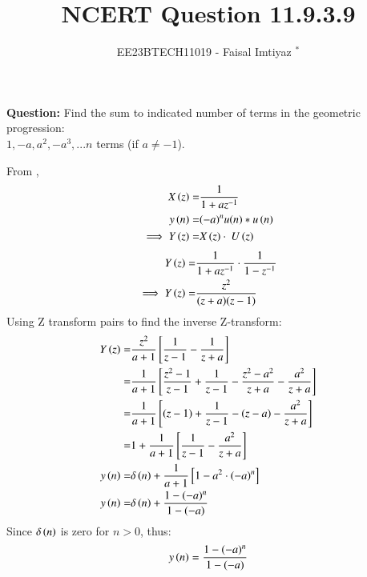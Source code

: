 \documentclass[journal,12pt,twocolumn]{IEEEtran}
\theoremstyle{remark}
\begin{document}

\vspace{3cm}
\title{NCERT Question 11.9.3.9}
\author{EE23BTECH11019 - Faisal Imtiyaz $^{*}$%
}
\maketitle
\newpage
\bigskip

\renewcommand{\thefigure}{\arabic{figure}}
\renewcommand{\thetable}{\arabic{table}}


\vspace{3cm}
\textbf{Question:} Find the sum to indicated number of terms in the geometric progression:\\
$1,-a, a^2, -a^3,...n$ terms (if $a\neq-1$).\\
\solution

\newline
From ,
\begin{align}
X\left(z\right) =& \frac{1}{1+az^{-1}}\\
y\left(n\right)= &{(-a)^n}u(n)*u\left(n\right)\\
\implies Y\left(z\right)= &X\left(z\right)\cdot\ U\left(z\right)
\end{align}
\begin{align}
    Y\left(z\right) = &\frac{1}{1+az^{-1}}\cdot\frac{1}{1-z^{-1}}\\
    \implies Y\left(z\right) = &\frac{z^{2}}{(z+a)(z-1)}
\end{align}
Using Z transform pairs  to find the inverse Z-transform:\\
\begin{align}
    Y\left(z\right)=& \frac{z^{2}}{a+1}{}\left[\frac{1}{z-1} - \frac{1}{z+a}\right]\\
    =& \frac{1}{a+1}{}\left[\frac{z^{2}-1}{z-1}+\frac{1}{z-1} -\frac{z^{2}-a^{2}}{z+a} -\frac{a^{2}}{z+a}\right] \\
    =& \frac{1}{a+1}{}\left[(z-1)+\frac{1}{z-1}-(z-a)-\frac{a^{2}}{z+a}\right]\\
    =& 1+\frac{1}{a+1}{}\left[\frac{1}{z-1}-\frac{a^{2}}{z+a}\right]\\
    y\left(n\right) =& \delta\left(n\right) + \frac{1}{a+1}{}\left[1- a^{2}\cdot(-a)^{n}\right]\\
    y\left(n\right) =& \delta\left(n\right)+ \frac{1-(-a)^{n}}{1-(-a)}\\
\end{align}
Since $\delta\left(n\right)$ is zero for $n>0$, thus:
\begin{align}
    y\left(n\right)=\frac{1-(-a)^{n}}{1-(-a)}\\
\end{align}
\end{document}
